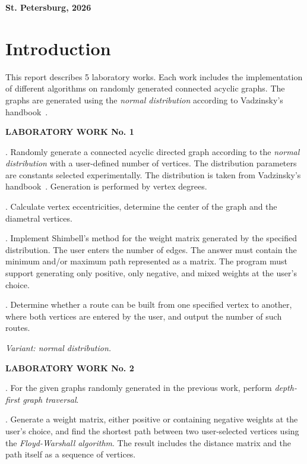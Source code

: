 \documentclass[a4paper,final]{article}
\begin{document}
	\hfill \break
	\hfill \break
	\begin{center} \small\bf{St. Petersburg, 2026} \end{center}
	\thispagestyle{empty}

\newpage
\renewcommand{\contentsname}{Contents}
\tableofcontents

\newpage
\section*{Introduction}

\indent This report describes 5 laboratory works. Each work includes the implementation of different algorithms on randomly generated connected acyclic graphs. The graphs are generated using the \textit{normal distribution} according to Vadzinsky's handbook~\cite{vadzinsky}.

\medskip
\noindent\textbf{LABORATORY WORK No. 1}

.\; Randomly generate a connected acyclic directed graph according to the \textit{normal distribution} with a user-defined number of vertices. The distribution parameters are constants selected experimentally. The distribution is taken from Vadzinsky's handbook~\cite{vadzinsky}. Generation is performed by vertex degrees.

.\; Calculate vertex eccentricities, determine the center of the graph and the diametral vertices.

.\; Implement Shimbell's method for the weight matrix generated by the specified distribution. The user enters the number of edges. The answer must contain the minimum and/or maximum path represented as a matrix. The program must support generating only positive, only negative, and mixed weights at the user's choice.

.\; Determine whether a route can be built from one specified vertex to another, where both vertices are entered by the user, and output the number of such routes.

\noindent\textit{Variant: normal distribution.}

\medskip
\noindent\textbf{LABORATORY WORK No. 2}

.\; For the given graphs randomly generated in the previous work, perform \textit{depth-first graph traversal}.

.\; Generate a weight matrix, either positive or containing negative weights at the user's choice, and find the shortest path between two user-selected vertices using the \textit{Floyd-Warshall algorithm}. The result includes the distance matrix and the path itself as a sequence of vertices.
\end{document}
